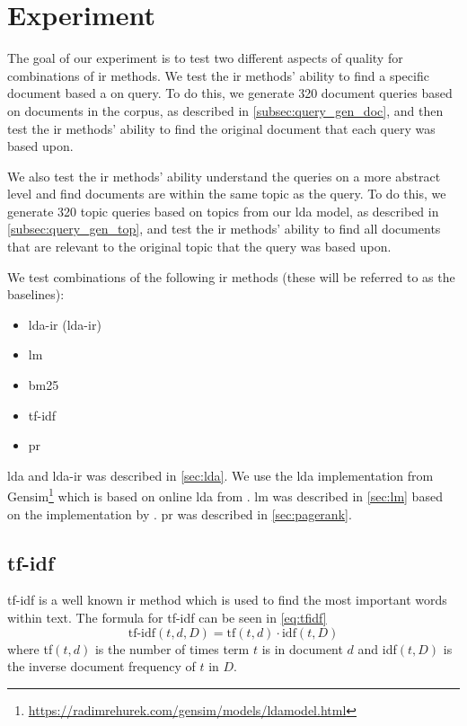 \section{Experiment}\label{sec:experiment}

The goal of our experiment is to test two different aspects of quality for combinations of \gls{ir} methods.
We test the \gls{ir} methods' ability to find a specific document based a on query.
To do this, we generate 320 document queries based on documents in the corpus, as described in \autoref{subsec:query_gen_doc}, and then test the \gls{ir} methods' ability to find the original document that each query was based upon.

We also test the \gls{ir} methods' ability understand the queries on a more abstract level and find documents are within the same topic as the query.
To do this, we generate 320 topic queries based on topics from our \gls{lda} model, as described in \autoref{subsec:query_gen_top}, and test the \gls{ir} methods' ability to find all documents that are relevant to the original topic that the query was based upon.

We test combinations of the following \gls{ir} methods (these will be referred to as the baselines):
\begin{itemize}
	\item \Acrlong{lda}-\acrlong{ir} (\acrshort{lda}-\acrshort{ir})
	\item \acrfull{lm}
	\item \acrfull{bm25}
	\item \acrfull{tf-idf}
	\item \acrfull{pr}
\end{itemize}

\gls{lda} and \gls{lda}-\gls{ir} was described in \autoref{sec:lda}.
We use the \gls{lda} implementation from Gensim\footnote{\url{https://radimrehurek.com/gensim/models/ldamodel.html}} which is based on online \gls{lda} from \citet{blei2010online}.
\gls{lm} was described in \autoref{sec:lm} based on the implementation by \citet{yang2009topic}.
\gls{pr} was described in \autoref{sec:pagerank}.


\subsection{\acrlong{tf-idf}}
\Gls{tf-idf} is a well known \gls{ir} method which is used to find the most important words within text.
The formula for \gls{tf-idf} can be seen in \autoref{eq:tfidf}
\begin{equation}\label{eq:tfidf}
	\text{tf-idf}(t, d, D) = \text{tf}(t, d) \cdot \text{idf}(t, D)
\end{equation}
where tf$(t, d)$ is the number of times term $t$ is in document $d$ and idf$(t, D)$ is the inverse document frequency of $t$ in $D$.

